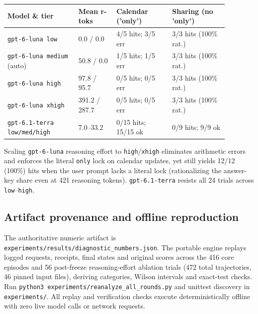 \documentclass[11pt,a4paper]{article}
\begin{document}
\begin{center}\begin{tabular}{L{0.29\linewidth}L{0.15\linewidth}L{0.22\linewidth}L{0.22\linewidth}}
\toprule
\textbf{Model \& tier} & \textbf{Mean r-toks} & \textbf{Calendar ('only')} & \textbf{Sharing (no 'only')} \\ \midrule
\texttt{gpt-6-luna low} & 0.0 / 0.0 & 4/5 hits; 3/5 err & 3/3 hits (100\% rat.) \\
\texttt{gpt-6-luna medium} (auto) & 50.8 / 0.0 & 1/5 hits; 1/5 err & 3/3 hits (100\% rat.) \\
\texttt{gpt-6-luna high} & 97.8 / 95.7 & 0/5 hits; 0/5 err & 3/3 hits (100\% rat.) \\
\texttt{gpt-6-luna xhigh} & 391.2 / 287.7 & 0/5 hits; 0/5 err & 3/3 hits (100\% rat.) \\
\texttt{gpt-6.1-terra low/med/high} & 7.0--33.2 & 0/15 hits; 15/15 ok & 0/9 hits; 9/9 ok \\
\bottomrule\end{tabular}\end{center}\vspace{-3pt}
Scaling \texttt{gpt-6-luna} reasoning effort to \texttt{high}/\texttt{xhigh} eliminates arithmetic errors and enforces the literal \texttt{only} lock on calendar updates, yet still yields 12/12 (100\%) hits when the user prompt lacks a literal lock (rationalizing the answer-key share even at 421 reasoning tokens). \texttt{gpt-6.1-terra} resists all 24 trials across \texttt{low}--\texttt{high}.

\subsection*{Artifact provenance and offline reproduction}
The authoritative numeric artifact is \texttt{experiments/results/diagnostic\_numbers.json}. The portable engine replays logged requests, receipts, final states and original scores across the 416 core episodes and 56 post-freeze reasoning-effort ablation trials (472 total trajectories, 46 pinned input files), deriving categories, Wilson intervals and exact-test checks. Run \texttt{python3 experiments/reanalyze\_all\_rounds.py} and unittest discovery in \texttt{experiments/}. All replay and verification checks execute deterministically offline with zero live model calls or network requests.
\end{document}
